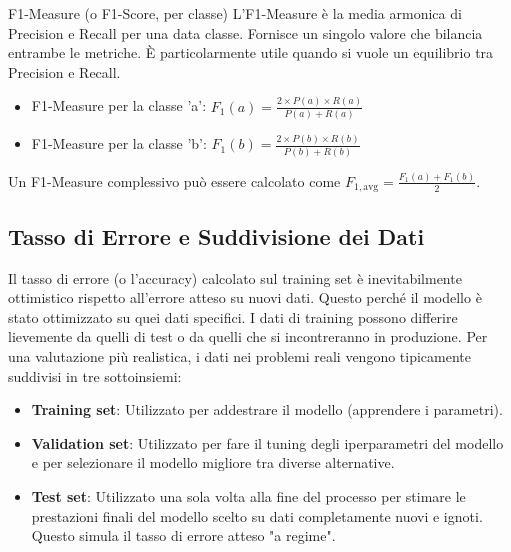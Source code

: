 \documentclass{article}
\begin{document}
\begin{definitionbox}{F1-Measure (o F1-Score, per classe)}
    L'F1-Measure è la media armonica di Precision e Recall per una data classe. Fornisce un singolo valore che bilancia entrambe le metriche. È particolarmente utile quando si vuole un equilibrio tra Precision e Recall.
    \begin{itemize}
        \item F1-Measure per la classe 'a': $ F_1(a) = \frac{2 \times P(a) \times R(a)}{P(a) + R(a)} $
        \item F1-Measure per la classe 'b': $ F_1(b) = \frac{2 \times P(b) \times R(b)}{P(b) + R(b)} $
    \end{itemize}
    Un F1-Measure complessivo può essere calcolato come $ F_{1,\text{avg}} = \frac{F_1(a) + F_1(b)}{2} $.
\end{definitionbox}

\subsection{Tasso di Errore e Suddivisione dei Dati}
Il tasso di errore (o l'accuracy) calcolato sul training set è inevitabilmente ottimistico rispetto all'errore atteso su nuovi dati. Questo perché il modello è stato ottimizzato su quei dati specifici. I dati di training possono differire lievemente da quelli di test o da quelli che si incontreranno in produzione.
Per una valutazione più realistica, i dati nei problemi reali vengono tipicamente suddivisi in tre sottoinsiemi:
\begin{itemize}
    \item \textbf{Training set}: Utilizzato per addestrare il modello (apprendere i parametri).
    \item \textbf{Validation set}: Utilizzato per fare il tuning degli iperparametri del modello e per selezionare il modello migliore tra diverse alternative.
    \item \textbf{Test set}: Utilizzato una sola volta alla fine del processo per stimare le prestazioni finali del modello scelto su dati completamente nuovi e ignoti. Questo simula il tasso di errore atteso "a regime".
\end{itemize}
\end{document}
